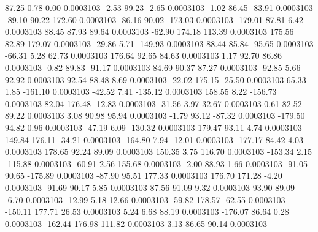        87.25        0.78        0.00     0.0003103
       -2.53       99.23       -2.65     0.0003103
       -1.02       86.45      -83.91     0.0003103
      -89.10       90.22      172.60     0.0003103
      -86.16       90.02     -173.03     0.0003103
     -179.01       87.81        6.42     0.0003103
       88.45       87.93       89.64     0.0003103
      -62.90      174.18      113.39     0.0003103
      175.56       82.89      179.07     0.0003103
      -29.86        5.71     -149.93     0.0003103
       88.44       85.84      -95.65     0.0003103
      -66.31        5.28       62.73     0.0003103
      176.64       92.65       84.63     0.0003103
        1.17       92.70       86.86     0.0003103
       -0.82       89.83      -91.17     0.0003103
       84.69       90.37       87.27     0.0003103
      -92.85        5.66       92.92     0.0003103
       92.54       88.48        8.69     0.0003103
      -22.02      175.15      -25.50     0.0003103
       65.33        1.85     -161.10     0.0003103
      -42.52        7.41     -135.12     0.0003103
      158.55        8.22     -156.73     0.0003103
       82.04      176.48      -12.83     0.0003103
      -31.56        3.97       32.67     0.0003103
        0.61       82.52       89.22     0.0003103
        3.08       90.98       95.94     0.0003103
       -1.79       93.12      -87.32     0.0003103
     -179.50       94.82        0.96     0.0003103
      -47.19        6.09     -130.32     0.0003103
      179.47       93.11        4.74     0.0003103
      149.84      176.11      -34.21     0.0003103
     -164.80        7.94      -12.01     0.0003103
     -177.17       84.42        4.03     0.0003103
      178.65       92.24       89.09     0.0003103
      150.35        3.75      116.70     0.0003103
     -153.34        2.15     -115.88     0.0003103
      -60.91        2.56      155.68     0.0003103
       -2.00       88.93        1.66     0.0003103
      -91.05       90.65     -175.89     0.0003103
      -87.90       95.51      177.33     0.0003103
      176.70      171.28       -4.20     0.0003103
      -91.69       90.17        5.85     0.0003103
       87.56       91.09        9.32     0.0003103
       93.90       89.09       -6.70     0.0003103
      -12.99        5.18       12.66     0.0003103
      -59.82      178.57      -62.55     0.0003103
     -150.11      177.71       26.53     0.0003103
        5.24        6.68       88.19     0.0003103
     -176.07       86.64        0.28     0.0003103
     -162.44      176.98      111.82     0.0003103
        3.13       86.65       90.14     0.0003103
